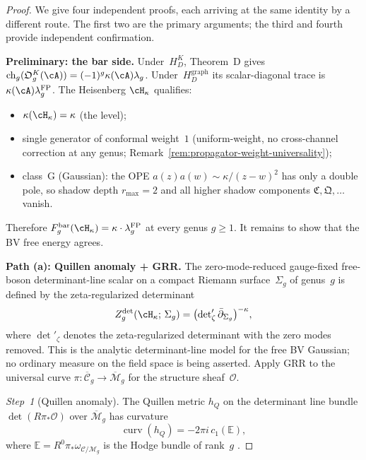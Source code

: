\begin{proof}
We give four independent proofs, each arriving at the same
identity by a different route. The first two are the primary
arguments; the third and fourth provide independent confirmation.

\medskip
\noindent\textbf{Preliminary: the bar side.}
Under~$H_D^K$, Theorem~D gives
$\operatorname{ch}_g(\mathfrak O_g^K(\cA))
=(-1)^g\kappa(\cA)\lambda_g$.  Under~$H_D^{\mathrm{graph}}$ its
scalar-diagonal trace is $\kappa(\cA)\lambda_g^{\mathrm{FP}}$.
The Heisenberg $\cH_\kappa$ qualifies:
\begin{itemize}[nosep]
\item $\kappa(\cH_\kappa) = \kappa$ (the level);
\item single generator of conformal weight~$1$
 (uniform-weight, no cross-channel correction at any genus;
 Remark~\ref{rem:propagator-weight-universality});
\item class~G (Gaussian): the OPE $a(z)a(w) \sim \kappa/(z{-}w)^2$
 has only a double pole, so shadow depth $r_{\max} = 2$ and all
 higher shadow components $\mathfrak{C}, \mathfrak{Q}, \ldots$
 vanish.
\end{itemize}
Therefore
$F_g^{\mathrm{bar}}(\cH_\kappa) = \kappa \cdot \lambda_g^{\mathrm{FP}}$
at every genus $g \geq 1$. It remains to show that the BV free
energy agrees.

\medskip
\noindent\textbf{Path \textup{(a)}: Quillen anomaly + GRR.}
The zero-mode-reduced gauge-fixed free-boson determinant-line scalar
on a compact Riemann surface~$\Sigma_g$ of genus~$g$ is defined by
the zeta-regularized determinant
\begin{equation}\label{eq:bv-partition-heisenberg}
Z_g^{\mathrm{det}}(\cH_\kappa;\,\Sigma_g)
= \bigl(\det\nolimits'_\zeta \bar\partial_{\Sigma_g}\bigr)^{-\kappa},
\end{equation}
where $\det'_\zeta$ denotes the zeta-regularized determinant
with the zero modes removed. This is the analytic determinant-line
model for the free BV Gaussian; no ordinary measure on the field space
is being asserted.
Apply GRR to the universal curve
$\pi\colon \overline{\mathcal{C}}_g
\to \overline{\mathcal{M}}_g$
for the structure sheaf~$\mathcal{O}$.

\emph{Step~1} \textup{(}Quillen anomaly\textup{)}.
The Quillen metric $h_Q$ on the determinant line bundle
$\det(R\pi_*\mathcal{O})$ over
$\overline{\mathcal{M}}_g$ has curvature
\[
\operatorname{curv}(h_Q)
= -2\pi i\, c_1(\mathbb{E}),
\]
where $\mathbb{E} = R^0\pi_*\omega_{\mathcal{C}/\mathcal{M}_g}$
is the Hodge bundle of rank~$g$ \cite{Quillen85}.


\end{proof}
